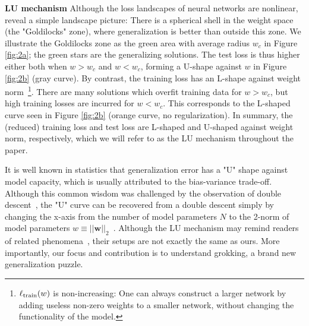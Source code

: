 \documentclass{article} %
\newcommand{\zm}[1]{{\color{black!100!blue} #1}}
\newcommand{\mat}[1]{\mathbf{#1}}
\begin{document}
{\bf LU mechanism} Although the loss landscapes of neural networks are  nonlinear,~\citep{fort2019goldilocks} reveal a simple landscape picture: There is a spherical shell in the weight space (the "Goldilocks" zone), where generalization is better than outside this zone. We illustrate the Goldilocks zone as the green area with average radius $w_c$ in Figure \ref{fig:2a}; the green stars are the generalizing solutions. The test loss is thus higher either both when $w>w_c$ and $w<w_c$, forming a U-shape against $w$ in Figure \ref{fig:2b} (gray curve). By contrast, the training loss has an L-shape against weight norm~\footnote{\zm{$\ell_{\rm train}(w)$ is non-increasing: One can always construct a larger network by adding useless non-zero weights to a smaller network, without changing the functionality of the model.}}. There are many solutions which overfit training data for $w>w_c$, but high training losses are incurred for $w<w_c$. This corresponds to the L-shaped curve seen in Figure \ref{fig:2b} (orange curve, no regularization). In summary, the (reduced) training loss and test loss are L-shaped and U-shaped against weight norm, respectively, which we will refer to as the LU mechanism throughout the paper.

It is well known in statistics that generalization error has a "U" shape against model capacity, which is usually attributed to the bias-variance trade-off. Although this common wisdom was challenged by the observation of double descent~\citep{nakkiran2021deep}, %
the "U" curve can be recovered from a double descent simply by changing the x-axis from the number of model parameters $N$ to the 2-norm of model parameters $w\equiv ||\mat{w}||_2$~\citep{CS229}. Although the LU mechanism may remind readers of related phenomena~\citep{schoenholz2016deep, yang2017mean, nakkiran2021deep}, their setups are not exactly the same as ours. More importantly, our focus and contribution is to understand grokking, a brand new generalization puzzle.
\end{document}
